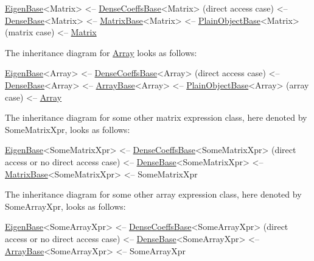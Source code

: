 \begin{DoxyPre}
\hyperlink{group___core___module_struct_eigen_1_1_eigen_base}{EigenBase}<Matrix>
  <-- \hyperlink{class_eigen_1_1_dense_coeffs_base}{DenseCoeffsBase}<Matrix>    (direct access case)
    <-- \hyperlink{group___core___module_class_eigen_1_1_dense_base}{DenseBase}<Matrix>
      <-- \hyperlink{group___core___module_class_eigen_1_1_matrix_base}{MatrixBase}<Matrix>
        <-- \hyperlink{class_eigen_1_1_plain_object_base}{PlainObjectBase}<Matrix>    (matrix case)
          <-- \hyperlink{group___core___module_class_eigen_1_1_matrix}{Matrix}
\end{DoxyPre}


The inheritance diagram for \hyperlink{group___core___module_class_eigen_1_1_array}{Array} looks as follows\+:


\begin{DoxyPre}
\hyperlink{group___core___module_struct_eigen_1_1_eigen_base}{EigenBase}<Array>
  <-- \hyperlink{class_eigen_1_1_dense_coeffs_base}{DenseCoeffsBase}<Array>    (direct access case)
    <-- \hyperlink{group___core___module_class_eigen_1_1_dense_base}{DenseBase}<Array>
      <-- \hyperlink{group___core___module_class_eigen_1_1_array_base}{ArrayBase}<Array>
        <-- \hyperlink{class_eigen_1_1_plain_object_base}{PlainObjectBase}<Array>    (array case)
          <-- \hyperlink{group___core___module_class_eigen_1_1_array}{Array}
\end{DoxyPre}


The inheritance diagram for some other matrix expression class, here denoted by {\ttfamily Some\+Matrix\+Xpr}, looks as follows\+:


\begin{DoxyPre}
\hyperlink{group___core___module_struct_eigen_1_1_eigen_base}{EigenBase}<SomeMatrixXpr>
  <-- \hyperlink{class_eigen_1_1_dense_coeffs_base}{DenseCoeffsBase}<SomeMatrixXpr>    (direct access or no direct access case)
    <-- \hyperlink{group___core___module_class_eigen_1_1_dense_base}{DenseBase}<SomeMatrixXpr>
      <-- \hyperlink{group___core___module_class_eigen_1_1_matrix_base}{MatrixBase}<SomeMatrixXpr>
        <-- SomeMatrixXpr
\end{DoxyPre}


The inheritance diagram for some other array expression class, here denoted by {\ttfamily Some\+Array\+Xpr}, looks as follows\+:


\begin{DoxyPre}
\hyperlink{group___core___module_struct_eigen_1_1_eigen_base}{EigenBase}<SomeArrayXpr>
  <-- \hyperlink{class_eigen_1_1_dense_coeffs_base}{DenseCoeffsBase}<SomeArrayXpr>    (direct access or no direct access case)
    <-- \hyperlink{group___core___module_class_eigen_1_1_dense_base}{DenseBase}<SomeArrayXpr>
      <-- \hyperlink{group___core___module_class_eigen_1_1_array_base}{ArrayBase}<SomeArrayXpr>
        <-- SomeArrayXpr
\end{DoxyPre}


